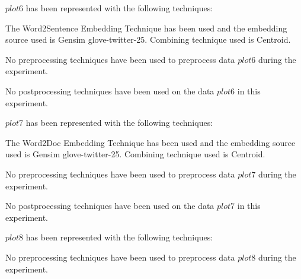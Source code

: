 \documentclass[11pt]{article}
\begin{document}
$ plot6 $  has been represented with the following techniques:
\hfill\break
\hfill\break



The Word2Sentence Embedding Technique has been used and
the embedding source used is
Gensim glove-twitter-25.
Combining technique used is
Centroid.
\hfill\break
\hfill\break



No preprocessing techniques have been used to preprocess data $ plot6 $ during the experiment.
\hfill\break
\hfill\break



No postprocessing techniques have been used on the data $ plot6 $ in this experiment.
\hfill\break
\hfill\break



$ plot7 $  has been represented with the following techniques:
\hfill\break
\hfill\break



The Word2Doc Embedding Technique has been used and
the embedding source used is
Gensim glove-twitter-25.
Combining technique used is
Centroid.
\hfill\break
\hfill\break



No preprocessing techniques have been used to preprocess data $ plot7 $ during the experiment.
\hfill\break
\hfill\break



No postprocessing techniques have been used on the data $ plot7 $ in this experiment.
\hfill\break
\hfill\break



$ plot8 $  has been represented with the following techniques:
\hfill\break
\hfill\break






No preprocessing techniques have been used to preprocess data $ plot8 $ during the experiment.
\hfill\break
\hfill\break
\end{document}
